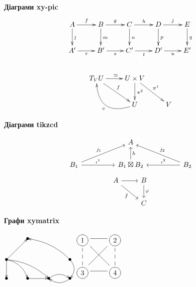 \documentclass[14pt]{extarticle}
\begin{document}
    \textbf{Діаграми xy-pic}
    \begin{gather*}
        \xymatrix{
            A \ar[r]^{f} \ar[d]^{l} & B \ar[r]^{g} \ar[d]^{m} & C \ar[r]^{h} \ar[d]^{n} & D \ar[r]^{j} \ar[d]^{p} & E \ar[d]^{q} \\
            A' \ar[r]_{r} & B' \ar[r]_{s} & C' \ar[r]_{t} & D' \ar[r]_{u} & E' \\
        } \\
        \hspace{5cm} \\
        \xymatrix{
            T_V U \ar[r]^{\simeq} \ar[rd]^{f} & U \times V \ar[d]^{\pi ^ 2} \ar[rd]^{\pi ^ 1} \\
            & U \ar@/^{2pc}/[ul]^{v} & V
        }\\
    \end{gather*}

    \textbf{Діаграми tikzcd}

    \[
        \begin{tikzcd}[column sep=huge]
            \ & A &\ \\
            B_1\urar{j_1}\rar{\iota^{1}} & B_1\boxtimes B_2\uar[swap]{h}
            & B_2\ular[swap]{j_2}\lar[swap]{\iota^{2}}
        \end{tikzcd}
    \]
    \[
        \begin{tikzcd}
            A \drar[swap]{f} \rar & B \dar{\varphi} \\
            & C
        \end{tikzcd}
    \]

    \textbf{Графи xymatrix}

    \begin{center}
        $
        \xymatrix{
            &*=0{\bullet}&&\\
            *=0{\bullet}
            \ar[d]
            \ar[ur]
            \ar@/^/[dr]
            \ar@/^/[drr]
            &&&*=0{\bullet}\ar@/^/[d]\ar@/_/[ull]
            \\
            *=0{\bullet}
            &*=0{\bullet}\ar[r]
            &*=0{\bullet}\ar@/^/[r]
            &*=0{\bullet}\ar@/^/[l]
        }
        $
        \hspace{1cm}
        $
        \xymatrix{
            \xy*{1}*\cir<8pt>{}\endxy\ar@{-}[r]                      & \xy*{2}*\cir<8pt>{}\endxy\ar@{--}[d]  \\
            \xy*{3}*\cir<8pt>{}\endxy\ar@{-}[ur]\ar@{-}[r]\ar@{--}[u] & \xy*{4}*\cir<8pt>{}\endxy\ar@{-}[lu]
        }
        $
    \end{center}
\end{document}
